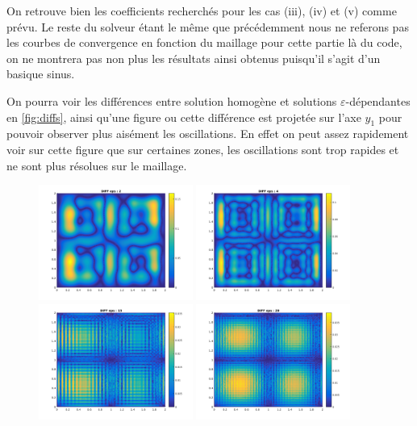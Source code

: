 \documentclass[11pt]{article}
\begin{document}
On retrouve bien les coefficients recherchés pour les cas (iii), (iv) et (v) comme prévu. Le reste du solveur étant le même que précédemment nous ne
referons pas les courbes de convergence en fonction du maillage pour cette partie là du code, on ne montrera pas non plus les résultats ainsi obtenus
puisqu'il s'agit d'un basique sinus. 


On pourra voir les différences entre solution homogène et solutions $\varepsilon$-dépendantes en \autoref{fig:diffs}, ainsi qu'une figure ou cette
différence est projetée sur l'axe $y_1$ pour pouvoir observer plus aisément les oscillations. En effet on peut assez rapidement voir sur cette figure
que sur certaines zones, les oscillations sont trop rapides et ne sont plus résolues sur le maillage.

\begin{figure}
  \centering
  \includegraphics[width=0.45\textwidth]{SolutionPbHomogeneise/diff_eps2}
  \includegraphics[width=0.45\textwidth]{SolutionPbHomogeneise/diff_eps4} \\
  \includegraphics[width=0.45\textwidth]{SolutionPbHomogeneise/diff_eps15}
  \includegraphics[width=0.45\textwidth]{SolutionPbHomogeneise/diff_eps20} \\

\end{figure}
\end{document}
